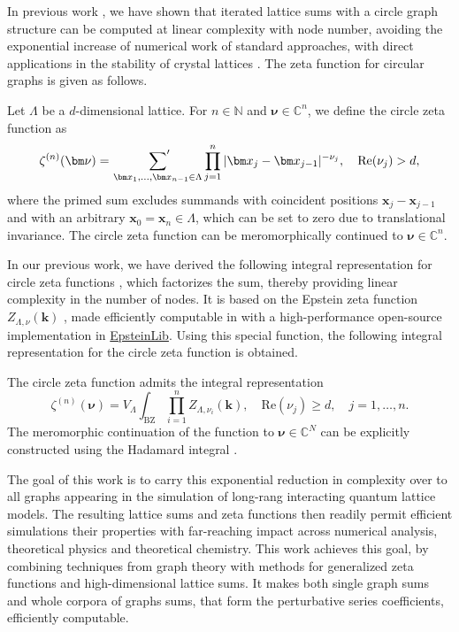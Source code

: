 \documentclass[]{amsart}
\numberwithin{mythm}{section}
\begin{document}
In previous work \cite{buchheit2025epstein_method}, we have shown that iterated lattice sums with a circle graph structure can be computed at linear complexity with node number, avoiding the exponential increase of numerical work of standard approaches, with direct applications in the stability of crystal lattices \cite{robles2025exact}.
The zeta function for circular graphs is given as follows.
\begin{definition}
Let $\Lambda$ be a $d$-dimensional lattice. For $n\in \mathds N$ and $\bm \nu\in \mathds C^n$, we define the circle zeta function as
\[
\zeta^{(n)}(\bm \nu) =  \,\sideset{}{'}\sum_{\bm x_1,\dots,\bm x_{n-1}\in \Lambda} \prod_{j=1}^n  \vert\bm x_j-\bm x_{j-1}\vert^{-\nu_j}, \quad \mathrm{Re}(\nu_j)>d,
\]
where the primed sum excludes summands with coincident positions $\bm x_j-\bm x_{j-1}$ and with an arbitrary $\bm x_0=\bm x_n\in \Lambda$, which can be set to zero due to translational invariance. The circle zeta function can be meromorphically continued to $\bm \nu\in \mathds C^n$.
\end{definition}
In our previous work, we have derived the following integral representation for circle zeta functions \cite[Theorem~2.6]{buchheit2025epstein_method}, which factorizes the sum, thereby providing linear complexity in the number of nodes. It is based on the Epstein zeta function $Z_{\Lambda,\nu}(\bm k)$ \cite{epstein1903theorieI,epstein1903theorieII}, made efficiently computable in \cite{buchheit2024epstein} with a high-performance open-source implementation in \href{https://github.com/epsteinlib/epsteinlib}{EpsteinLib}. Using this special function, the following integral representation for the circle zeta function is obtained.
\begin{theorem}
The circle zeta function admits the integral representation
\[
    \zeta^{(n)}(\bm \nu) = V_\Lambda \int_{\mathrm{BZ}} \prod_{i=1}^n Z_{\Lambda,\nu_i}(\bm k),\quad \mathrm{Re}(\nu_j)\ge d,\quad j=1,\dots,n.
\]
The meromorphic continuation of the function to $\bm \nu \in \mathds C^N$ can be explicitly constructed using the Hadamard integral \cite{gelfand1964generalizedI}.
\end{theorem}
The goal of this work is to carry this exponential reduction in complexity over to all graphs appearing in the simulation of long-rang interacting quantum lattice models. The resulting lattice sums and zeta functions then readily permit efficient simulations their properties with far-reaching impact across numerical analysis, theoretical physics and theoretical chemistry. 
This work achieves this goal, by combining techniques from graph theory with methods for generalized zeta functions and high-dimensional lattice sums. It makes both single graph sums and whole corpora of graphs sums, that form the perturbative series coefficients, efficiently computable. 
\end{document}
